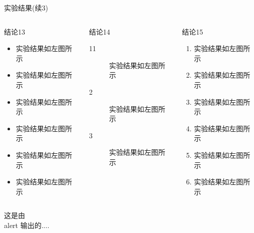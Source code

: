 \documentclass[8pt,compress,t,notheorems,noamsthm,notheorem,xcolor=x11names]{beamer}
\theoremstyle{nonumberplain}%
\theoremstyle{plain}
\begin{document}
\begin{frame}{实验结果(续3)}
\begin{columns}[T,onlytextwidth]
	
	\begin{column}{0.30\textwidth}
		\begin{exampleblock}{结论13}
			\begin{itemize}
				\item 实验结果如左图所示
				\item 实验结果如左图所示
				\item 实验结果如左图所示
				\item 实验结果如左图所示
				\item 实验结果如左图所示
				\item 实验结果如左图所示
			\end{itemize}
		\end{exampleblock}
	\end{column}
	
	\begin{column}{0.30\textwidth}
		\begin{exampleblock}{结论14}
			\begin{description}
				\item[11] 实验结果如左图所示
				\item[2] 实验结果如左图所示
				\item[3] 实验结果如左图所示
				
			\end{description}
		\end{exampleblock}
	\end{column}
	
	\begin{column}{0.30\textwidth}
		\begin{exampleblock}{结论15}
			\begin{enumerate}
				\item 实验结果如左图所示
				\item 实验结果如左图所示
				\item 实验结果如左图所示
				\item 实验结果如左图所示
				\item 实验结果如左图所示
				\item 实验结果如左图所示
			\end{enumerate}
		\end{exampleblock}
	\end{column}
\end{columns}

\alert{这是由 \\ alert 输出的....}

\end{frame}
\end{document}
